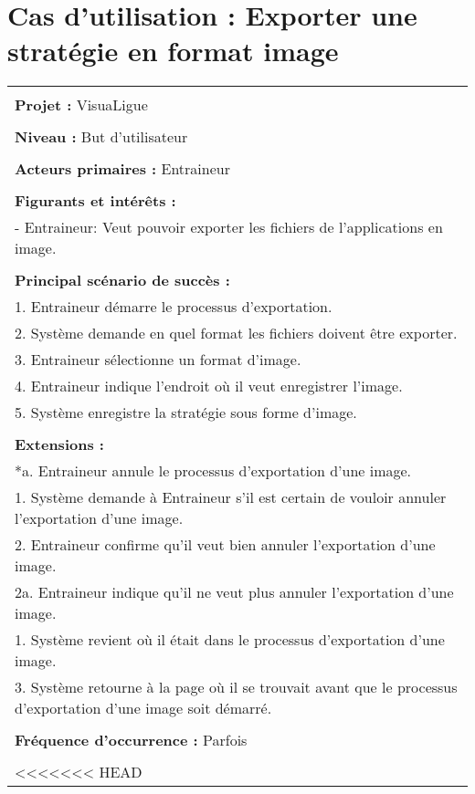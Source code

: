 \section{Cas d'utilisation : Exporter une stratégie en format image}
\begin{longtable}{|p{16cm}|}
	\hline
	\\
	\textbf{Projet :} VisuaLigue\\
	\\
	\textbf{Niveau :} But d'utilisateur\\
	\\
	\textbf{Acteurs primaires :} Entraineur\\
	\\
	\textbf{Figurants et intérêts :} \\
	- Entraineur: Veut pouvoir exporter les fichiers de l'applications en image.\\
	\\
	\textbf{Principal scénario de succès :}\\
	1. Entraineur démarre le processus d'exportation.\\
	2. Système demande en quel format les fichiers doivent être exporter.\\
	3. Entraineur sélectionne un format d'image.\\
	4. Entraineur indique l'endroit où il veut enregistrer l'image.\\
	5. Système enregistre la stratégie sous forme d'image.\\
	\\
	\textbf{Extensions :}\\
	*a. Entraineur annule le processus d'exportation d'une image.\\
	\hspace{1cm}1. Système demande à Entraineur s'il est certain de vouloir annuler l'exportation d'une image.\\
	\hspace{1cm}2. Entraineur confirme qu'il veut bien annuler l'exportation d'une image.\\
	\hspace{2cm}2a. Entraineur indique qu'il ne veut plus annuler l'exportation d'une image.\\
	\hspace{3cm}1. Système revient où il était dans le processus d'exportation d'une image.\\
	\hspace{1cm}3. Système retourne à la page où il se trouvait avant que le processus d'exportation d'une image soit démarré.\\
	\\
	\textbf{Fréquence d'occurrence :} Parfois\\
	\\
	\hline
<<<<<<< HEAD
\end{tabular}


\end{longtable}

